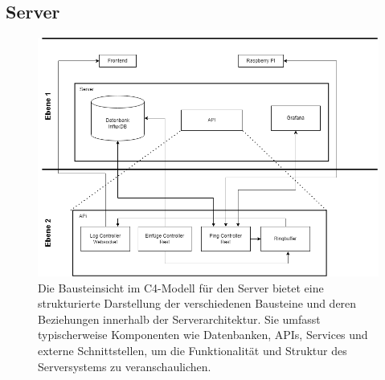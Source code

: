 \documentclass[
]{article}
\begin{document}
\subsection{Server}
\begin{figure}[H]
	\centering
	\includegraphics[width=130mm]{resources/Bausteinsicht_Server.png}
	\caption{Die Bausteinsicht im C4-Modell für den Server bietet eine strukturierte Darstellung der verschiedenen Bausteine und deren Beziehungen innerhalb der Serverarchitektur. Sie umfasst typischerweise Komponenten wie Datenbanken, APIs, Services und externe Schnittstellen, um die Funktionalität und Struktur des Serversystems zu veranschaulichen.}
	\label{fig:BausteinServer}
\end{figure}  
\end{document}
